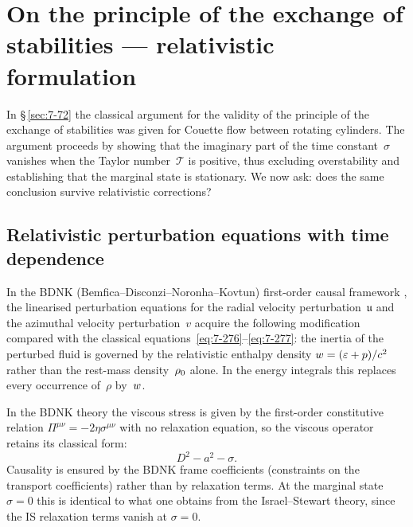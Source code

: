 
\section{On the principle of the exchange of stabilities --- relativistic formulation}
\label{sec:rel-7-72}

In \S\,\ref{sec:7-72} the classical argument for the validity of the
principle of the exchange of stabilities was given for Couette flow
between rotating cylinders.  The argument proceeds by showing that the
imaginary part of the time constant~$\sigma$ vanishes when the Taylor
number~$\mathscr{T}$ is positive, thus excluding overstability and
establishing that the marginal state is stationary.  We now ask: does the
same conclusion survive relativistic corrections?

\subsection{Relativistic perturbation equations with time dependence}
\label{sec:rel-7-72a}

In the BDNK (Bemfica--Disconzi--Noronha--Kovtun) first-order causal
framework \citep{BemficaDN2018,Kovtun2019}, the linearised perturbation
equations for the radial velocity perturbation~$\mathfrak{u}$ and the
azimuthal velocity perturbation~$v$ acquire the following modification
compared with the classical equations~\eqref{eq:7-276}--\eqref{eq:7-277}:
the inertia of the perturbed fluid is governed by the relativistic
enthalpy density $w = (\varepsilon + p)/c^{2}$ rather than the
rest-mass density~$\rho_0$ alone.  In the energy integrals this
replaces every occurrence of~$\rho$ by~$w$.

In the BDNK theory the viscous stress is given by the first-order
constitutive relation $\Pi^{\mu\nu}=-2\eta\sigma^{\mu\nu}$ with no
relaxation equation, so the viscous operator retains its classical form:
\begin{equation}
\label{eq:rel-7-276}
D^{2}-a^{2}-\sigma.
\end{equation}
Causality is ensured by the BDNK frame coefficients (constraints on
the transport coefficients) rather than by relaxation terms.  At the
marginal state $\sigma=0$ this is identical to what one obtains from
the Israel--Stewart theory, since the IS relaxation terms vanish at
$\sigma=0$.

